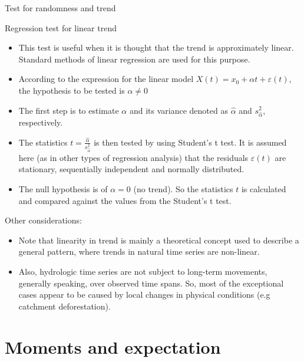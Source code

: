 \documentclass[8pt]{beamer}
\renewcommand{\emph}[1]{\textcolor{myorange}{#1}}
\begin{document}
\begin{frame}{Test for randomness and trend}
    \begin{block}{Regression test for linear trend}
\end{block}
    \begin{itemize}
        \item This test is useful when it is thought that the \emph{trend} is approximately \emph{linear}. Standard methods of \emph{linear regression} are used for this purpose. 
        \item According to the expression for the \emph{linear model}  $X(t) = x_0 + \alpha t + \varepsilon (t)$, the hypothesis to be tested is $\alpha \neq 0$
        \item The first step is to estimate $\alpha$ and its variance denoted as $\hat{\alpha}$ and $s_{\hat{\alpha}}^2$, respectively. 
        \item The statistics $t = \frac{\hat{\alpha}}{s_{\hat{\alpha}}^2}$ is then tested by using \emph{Student's t test}. It is assumed here (as in other types of \emph{regression analysis})  that the \emph{residuals} $\varepsilon (t)$ are \emph{stationary}, sequentially \emph{independent} and \emph{normally distributed}.  
        \item The \emph{null hypothesis} is of $\alpha=0$ (\emph{no trend}). So the statistics $t$ is calculated and compared against the values from the \emph{Student's t test}.  
    \end{itemize}
    Other considerations:
    \begin{itemize}
        \item Note that \emph{linearity} in \emph{trend} is mainly a theoretical concept used to describe a general pattern, where \emph{trends} in natural time series are \emph{non-linear}. 
        \item Also, \emph{hydrologic time series} are not subject to \emph{long-term movements}, generally speaking, over observed time spans. So, most of the exceptional cases appear to be caused by \emph{local changes} in \emph{physical conditions} (e.g catchment deforestation).
    \end{itemize}
\end{frame}
 

\section{Moments and expectation}
\end{document}
